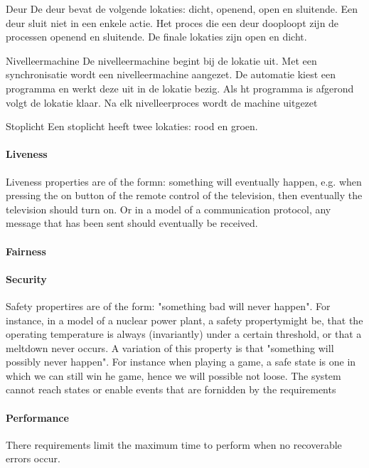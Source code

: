 Deur
De deur bevat de volgende lokaties: dicht, openend, open en sluitende.
Een deur sluit niet in een enkele actie. Het proces die een deur dooploopt zijn de processen openend en sluitende. De finale lokaties zijn open en dicht.

Nivelleermachine
De nivelleermachine begint bij de lokatie uit. Met een synchronisatie wordt een nivelleermachine aangezet. De automatie kiest een programma en werkt deze uit in de lokatie bezig. Als ht programma is afgerond volgt de lokatie klaar. Na elk nivelleerproces wordt de machine uitgezet

Stoplicht
Een stoplicht heeft twee lokaties: rood en groen.




\paragraph{Liveness}
Liveness properties are of the formn: something will eventually happen, e.g. when pressing the on button of the remote control of the television, then eventually the television should turn on. Or in a model of a  communication protocol, any message that has been sent should eventually be received.
\paragraph{Fairness}
\paragraph{Security}
Safety propertires are of the form: "something bad will never happen". For instance, in a model of a nuclear power plant, a safety propertymight be, that the operating temperature is always (invariantly) under a certain threshold, or that a meltdown never occurs. A variation of this property is that "something will possibly never happen".
For instance when playing a game, a safe state is one in which we can still win he game, hence we will possible not loose.
The system cannot reach states or enable events that are fornidden by the requirements
\paragraph{Performance}
There requirements limit the maximum time to perform when no recoverable errors occur.





